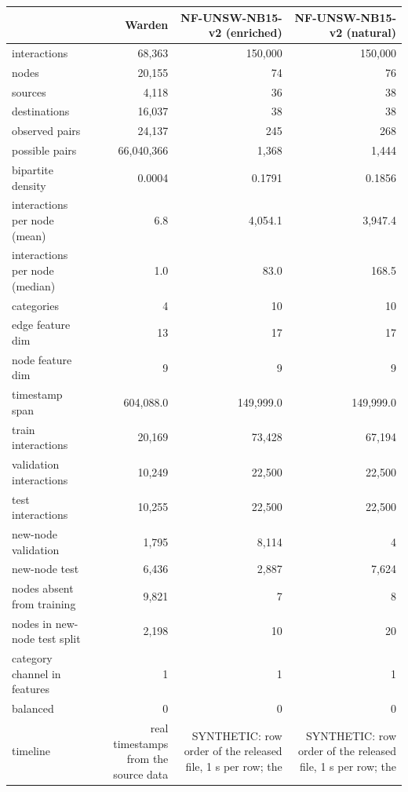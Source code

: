 \begin{tabular}{lrrr}
\toprule
 & Warden & NF-UNSW-NB15-v2 (enriched) & NF-UNSW-NB15-v2 (natural) \\
\midrule
interactions & 68,363 & 150,000 & 150,000 \\
nodes & 20,155 & 74 & 76 \\
sources & 4,118 & 36 & 38 \\
destinations & 16,037 & 38 & 38 \\
observed pairs & 24,137 & 245 & 268 \\
possible pairs & 66,040,366 & 1,368 & 1,444 \\
bipartite density & 0.0004 & 0.1791 & 0.1856 \\
interactions per node (mean) & 6.8 & 4,054.1 & 3,947.4 \\
interactions per node (median) & 1.0 & 83.0 & 168.5 \\
categories & 4 & 10 & 10 \\
edge feature dim & 13 & 17 & 17 \\
node feature dim & 9 & 9 & 9 \\
timestamp span & 604,088.0 & 149,999.0 & 149,999.0 \\
train interactions & 20,169 & 73,428 & 67,194 \\
validation interactions & 10,249 & 22,500 & 22,500 \\
test interactions & 10,255 & 22,500 & 22,500 \\
new-node validation & 1,795 & 8,114 & 4 \\
new-node test & 6,436 & 2,887 & 7,624 \\
nodes absent from training & 9,821 & 7 & 8 \\
nodes in new-node test split & 2,198 & 10 & 20 \\
category channel in features & 1 & 1 & 1 \\
balanced & 0 & 0 & 0 \\
timeline & real timestamps from the source data & SYNTHETIC: row order of the released file, 1 s per row; the  & SYNTHETIC: row order of the released file, 1 s per row; the  \\
\bottomrule
\end{tabular}
